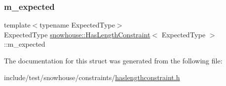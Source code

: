 \subsubsection{\texorpdfstring{m\_expected}{m\_expected}}
{\footnotesize\ttfamily template$<$typename Expected\+Type$>$ \\
Expected\+Type \mbox{\hyperlink{structsnowhouse_1_1HasLengthConstraint}{snowhouse\+::\+Has\+Length\+Constraint}}$<$ Expected\+Type $>$\+::m\+\_\+expected}



The documentation for this struct was generated from the following file\+:\begin{DoxyCompactItemize}
\item 
include/test/snowhouse/constraints/\mbox{\hyperlink{haslengthconstraint_8h}{haslengthconstraint.\+h}}\end{DoxyCompactItemize}
